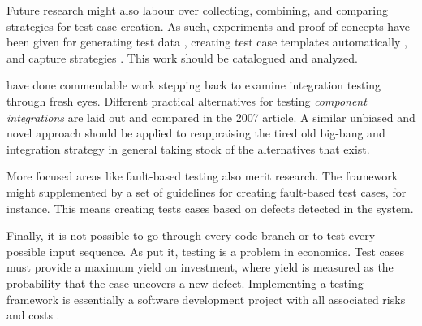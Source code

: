 \documentclass[12pt,a4paper,oneside,pdftex]{report}
\begin{document}
{Future research might also labour over collecting, combining, and comparing strategies for test case creation. As such, experiments and proof of concepts have been given for generating test data \citep{linnenkugel1990test}, creating test case templates automatically \citep{bai2005WSDL}, and capture strategies \citep{meszaros2003agile}. This work should be catalogued and analyzed.

\citet{rehman2007testing} have done commendable work stepping back to examine integration testing through fresh eyes. Different practical alternatives for testing \emph{component integrations} are laid out and compared in the 2007 article. A similar unbiased and novel approach should be applied to reappraising the tired old big-bang and integration strategy in general taking stock of the alternatives that exist.

More focused areas like fault-based testing also merit research. The framework might supplemented by a set of guidelines for creating fault-based test cases, for instance. This means creating tests cases based on defects detected in the system.

Finally, it is not possible to go through every code branch or to test every possible input sequence. As \citet{myers1976software} put it, testing is a problem in economics. Test cases must provide a maximum yield on investment, where yield is measured as the probability that the case uncovers a new defect. \citep{myers1976software} Implementing a testing framework is essentially a software development project with all associated risks and costs \citep{kaner1997pitfalls}. 


\begin{comment}
Future research:
capture playback popular still despite warnings, what's up? when is it not applicable?
relationship between automation and manual work, test automation manual maintenance
integration test strategy in the vein if rehmann, what options/technical strategies are there? tired old big-bang
Strategies for test case creation (zeng & tan 2013)
study merits of fault based testing for more efficient tests
distinction between a technological configuration and process model is difficult.

notion of unit to system antiquated, block to block also
more an issue of test case construction and traceability
end-to-end tests are adequate if they can point to problem code accurately
\end{comment}

}
\end{document}

